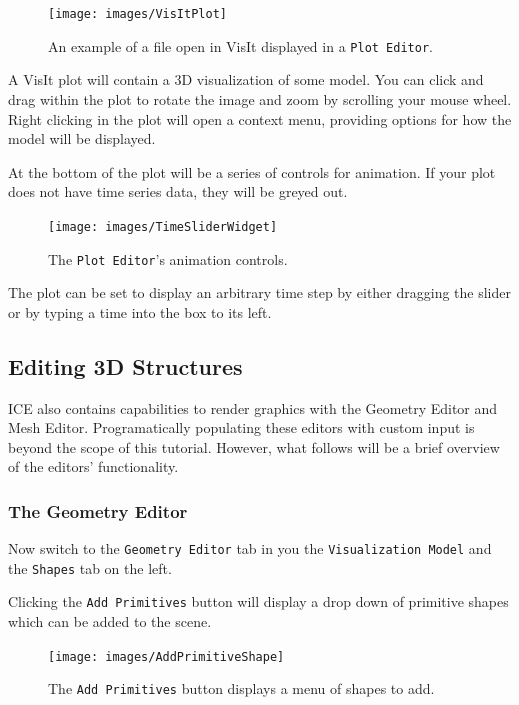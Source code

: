 \begin{figure}[!h]
\texttt{[image: images/VisItPlot]}
\centering
\caption{An example of a file open in VisIt displayed in a \texttt{Plot
Editor}.}
\label{fig:visitplot}
\end{figure}

A VisIt plot will contain a 3D visualization of some model. You can click and
drag within the plot to rotate the image and zoom by scrolling your mouse wheel.
Right clicking in the plot will open a context menu, providing options for how
the model will be displayed.

At the bottom of the plot will be a series of controls for animation. If your
plot does not have time series data, they will be greyed out. 

\begin{figure}[!h]
\texttt{[image: images/TimeSliderWidget]} 
\centering
\caption{The \texttt{Plot Editor}'s animation controls.}
\label{fig:timesliderwidget}
\end{figure}

The plot can be set to display an arbitrary time step by either dragging the
slider or by typing a time into the box to its left.

\subsection{Editing 3D Structures}

ICE also contains capabilities to render graphics with the Geometry Editor and
Mesh Editor. Programatically populating these editors with custom input is
beyond the scope of this tutorial. However, what follows will be a brief
overview of the editors' functionality.

\subsubsection{The Geometry Editor}

Now switch to the \texttt{Geometry Editor} tab in you the \texttt{Visualization
Model} and the \texttt{Shapes} tab on the left.

Clicking the \texttt{Add Primitives} button will display a drop down of
primitive shapes which can be added to the scene.

\begin{figure}[!h]
\texttt{[image: images/AddPrimitiveShape]}
\centering
\caption{The \texttt{Add Primitives} button displays a menu of shapes to add.}
\label{fig:addprimitiveshape}
\end{figure}

